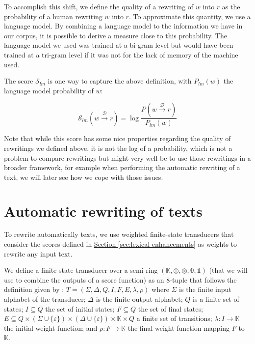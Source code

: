 \documentclass[a4paper, 11pt, onepage]{scrreprt}
\newcommand\sectionref[1]{\hyperref[#1]{Section \ref*{#1}}}
\newcommand\maps[1]{\xrightarrow{\mathcal{#1}}}
\newcommand\proba[2][]{P_{#1} \left( #2 \right)}
\begin{document}
To accomplish this shift, we define the quality of a rewriting of $w$
into $r$ as the probability of a human rewriting $w$ into $r$. To
approximate this quantity, we use a language model. By combining a
language model to the information we have in our corpus, it is
possible to derive a measure close to this probability. The language
model we used was trained at a bi-gram level but would have been
trained at a tri-gram level if it was not for the lack of memory of
the machine used.

The score $\mathcal{S}_{lm}$ is one way to capture the above
definition, with $\proba[lm]{w}$ the language model probability of
$w$:

\begin{equation*}
  \mathcal{S}_{lm}(w \maps{D} r) = \log \frac{\proba{w \maps{D} r}}%
  {\proba[lm]{w}}
\end{equation*}

Note that while this score has some nice properties regarding the
quality of rewritings we defined above, it is not the log of a
probability, which is not a problem to compare rewritings but might
very well be to use those rewritings in a broader framework, for
example when performing the automatic rewriting of a text, we will
later see how we cope with those issues.

\section{Automatic rewriting of texts}
\label{sec:rewriting}

To rewrite automatically texts, we use weighted finite-state
transducers that consider the scores defined
in \sectionref{sec:lexical-enhancements} as weights to rewrite any
input text.

We define a finite-state transducer over a semi-ring $(\mathbb{K},
\oplus, \otimes, \mathbb{0}, \mathbb{1})$ (that we will use to combine
the outputs of a score function) as an 8-tuple that follows the
definition given by \cite{mohri2004weighted}: $T = (\Sigma, \Delta, Q,
I, F, E, \lambda, \rho)$ where $\Sigma$ is the finite input alphabet
of the transducer; $\Delta$ is the finite output alphabet; $Q$ is a
finite set of states; $I \subseteq Q$ the set of initial states; $F
\subseteq Q$ the set of final states; $E \subseteq Q \times (\Sigma
\cup \{\varepsilon\}) \times (\Delta \cup \{\varepsilon\}) \times
\mathbb{K} \times Q$ a finite set of transitions; $λ : I \rightarrow
\mathbb{K}$ the initial weight function; and $ρ : F \rightarrow
\mathbb{K}$ the final weight function mapping $F$ to $\mathbb{K}$.
\end{document}
